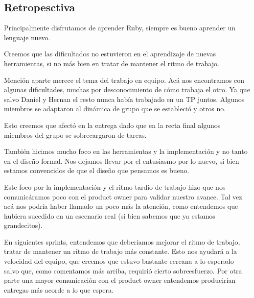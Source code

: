 \subsection{Retropesctiva}
Principalmente disfrutamos de aprender Ruby, siempre es bueno aprender un lenguaje nuevo.

Creemos que las dificultados no estuvieron en el aprendizaje de nuevas herramientas, si no más bien en tratar de mantener el ritmo de trabajo.

Mención aparte merece el tema del trabajo en equipo. Acá nos encontramos con algunas dificultades, muchas por desconocimiento de cómo trabaja el otro. Ya que salvo Daniel y Hernan el resto nunca había trabajado en un TP juntos. Algunos miembros se adaptaron al dinámica de grupo que se estableció y otros no. 

Esto creemos que afectó en la entrega dado que en la recta final algunos miembros del grupo se sobrecargaron de tareas.

También hicimos mucho foco en las herramientas y la implementación y no tanto en el diseño formal. Nos dejamos llevar por el entusiasmo por lo nuevo, si bien estamos convencidos de que el diseño que pensamos es bueno.

Este foco por la implementación y el ritmo tardío de trabajo hizo que nos comunicáramos poco con el product owner para validar nuestro avance. Tal vez acá nos podría haber llamado un poco más la atención, como entendemos que hubiera sucedido en un escenario real (si bien sabemos que ya estamos grandecitos).

En siguientes sprints, entendemos que deberíamos mejorar el ritmo de trabajo, tratar de mantener un ritmo de trabajo más constante. Esto nos ayudará a la velocidad del equipo, que creemos que estuvo bastante cercana a lo esperado salvo que, como comentamos más arriba, requirió cierto sobreesfuerzo. Por otra parte una mayor comunicación con el product owner entendemos producirían entregas más acorde a lo que espera.


